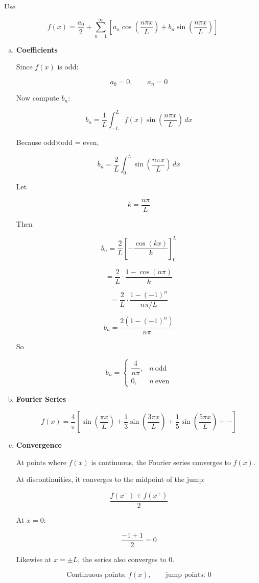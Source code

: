 \documentclass[12pt]{article}
\begin{document}
Use

\[
f(x)=\frac{a_0}{2}+\sum_{n=1}^{\infty}
\left[
a_n\cos\left(\frac{n\pi x}{L}\right)+
b_n\sin\left(\frac{n\pi x}{L}\right)
\right]
\]

\begin{enumerate}[a)]

\item \textbf{Coefficients}

Since \(f(x)\) is odd:

\[
\boxed{a_0=0,\qquad a_n=0}
\]

Now compute \(b_n\):

\[
b_n=\frac{1}{L}\int_{-L}^{L}f(x)\sin\left(\frac{n\pi x}{L}\right)\,dx
\]

Because odd\(\times\)odd = even,

\[
b_n=\frac{2}{L}\int_0^L \sin\left(\frac{n\pi x}{L}\right)\,dx
\]

Let

\[
k=\frac{n\pi}{L}
\]

Then

\[
b_n=\frac{2}{L}\left[-\frac{\cos(kx)}{k}\right]_0^L
\]

\[
=\frac{2}{L}\cdot\frac{1-\cos(n\pi)}{k}
\]

\[
=\frac{2}{L}\cdot\frac{1-(-1)^n}{n\pi/L}
\]

\[
\boxed{
b_n=\frac{2(1-(-1)^n)}{n\pi}}
\]

So

\[
\boxed{
b_n=
\begin{cases}
\dfrac{4}{n\pi}, & n\ \text{odd}\\[6pt]
0, & n\ \text{even}
\end{cases}}
\]

\item \textbf{Fourier Series}

\[
\boxed{
f(x)=\frac{4}{\pi}
\left[
\sin\left(\frac{\pi x}{L}\right)
+\frac13\sin\left(\frac{3\pi x}{L}\right)
+\frac15\sin\left(\frac{5\pi x}{L}\right)
+\cdots
\right]}
\]

\item \textbf{Convergence}

At points where \(f(x)\) is continuous, the Fourier series converges to \(f(x)\).

At discontinuities, it converges to the midpoint of the jump:

\[
\frac{f(x^-)+f(x^+)}{2}
\]

At \(x=0\):

\[
\frac{-1+1}{2}=0
\]

Likewise at \(x=\pm L\), the series also converges to \(0\).

\[
\boxed{\text{Continuous points: }f(x),\qquad
\text{jump points: }0}
\]

\end{enumerate}
\end{document}
